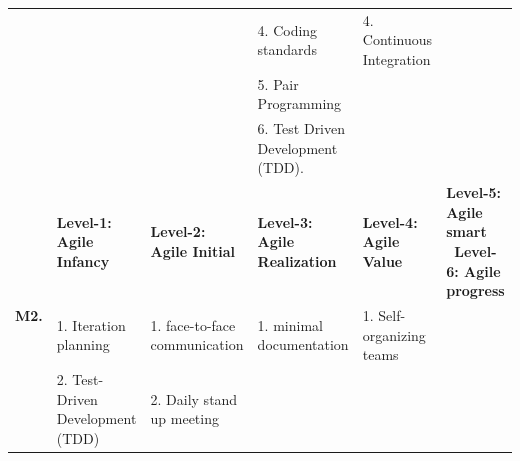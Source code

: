 \documentclass[a4paper,oneside]{bth}
\begin{document}
\begin{longtable}{|p{1.3cm}|p{2cm}|p{2cm}|p{2.7cm}|p{2cm} |p{2cm} |}
				&                                                      & \multirow{3}{*}{}                                           & 4. Coding standards                                                                                 & 4. Continuous Integration                              & \multirow{3}{*}{}                                                                            \\ \cline{4-5}
				&                                                      &                                                             & 5. Pair Programming                                                                                 & \multirow{2}{*}{}                                      &                                                                                              \\ \cline{4-4}
				&                                                      &                                                             & 6. Test Driven Development (TDD).                                                                   &                                                        &                                                                                              \\ \hline
				\multirow{4}{*}{\textbf{M2.}}  & \textbf{Level-1: Agile Infancy}                      & \textbf{Level-2: Agile Initial}                             & \textbf{Level-3: Agile Realization}                                                                 & \textbf{Level-4: Agile Value}                          & \textbf{Level-5: Agile smart \ Level-6: Agile progress}                                      \\ \cline{2-6} 
				& 1. Iteration planning                                & 1. face-to-face communication                               & 1. minimal documentation                                                                            & 1. Self-organizing teams                               & \multirow{3}{*}{}                                                                            \\ \cline{2-5}
				& 2. Test-Driven Development (TDD)                     & 2. Daily stand up meeting                                   & \multirow{2}{*}{}                                                                                   & \multirow{2}{*}{}                                      &                                                                                              \\ \cline{2-3}

\end{longtable}
\end{document}
